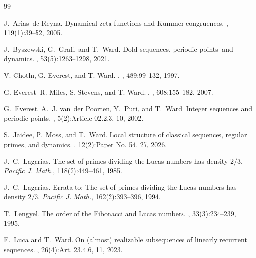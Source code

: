\documentclass[]{interact}
\theoremstyle{plain}
\numberwithin{equation}{section} %
\numberwithin{table}{section} %
\numberwithin{figure}{section}
\begin{document}
\begin{thebibliography}{99}

J.~Arias~de Reyna.
\newblock Dynamical zeta functions and {Kummer} congruences.
, 119(1):39--52, 2005.

J.~Byszewski, G.~Graff, and T.~Ward.
\newblock Dold sequences, periodic points, and dynamics.
, 53(5):1263--1298, 2021.

V. Chothi, G. Everest, and T. Ward.
.
, {489}:99--132, 1997.


G. Everest, R. Miles, S. Stevens, and T. Ward.
.
, {608}:155--182, 2007.

G.~Everest, A.~J. van~der Poorten, Y.~Puri, and T.~Ward.
\newblock Integer sequences and periodic points.
, 5(2):Article 02.2.3, 10, 2002.

S.~Jaidee, P.~Moss, and T.~Ward.
\newblock Local structure of classical sequences, regular primes, and dynamics.
, 12(2):Paper No. 54, 27, 2026.

J.~C.~Lagarias.
\newblock The set of primes dividing the {L}ucas numbers has density \(2/3\).
\newblock \href{https://doi.org/10.2140/pjm.1985.118.449}
{{\em Pacific J. Math.}}, 118(2):449--461, 1985.

J.~C.~Lagarias.
\newblock Errata to: The set of primes dividing the {L}ucas numbers has
density \(2/3\).
\newblock \href{https://doi.org/10.2140/pjm.1994.162.393}
{{\em Pacific J. Math.}}, 162(2):393--396, 1994.

T.~Lengyel.
\newblock The order of the {F}ibonacci and {L}ucas numbers.
, 33(3):234--239, 1995.

F.~Luca and T.~Ward.
\newblock On (almost) realizable subsequences of linearly recurrent sequences.
, 26(4):Art. 23.4.6, 11, 2023.


\end{thebibliography}
\end{document}
